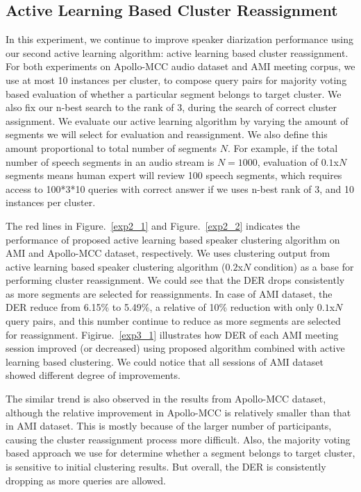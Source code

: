 \documentclass[journal,10pt]{IEEEtran}
\begin{document}
\subsection{Active Learning Based Cluster Reassignment}
In this experiment, we continue to improve speaker diarization performance using our second active learning algorithm: active learning based cluster reassignment. For both experiments on Apollo-MCC audio dataset and AMI meeting corpus, we use at most 10 instances per cluster, to compose query pairs for majority voting based evaluation of whether a particular segment belongs to target cluster. We also fix our n-best search to the rank of 3, during the search of correct cluster assignment. We evaluate our active learning algorithm by varying the amount of segments we will select for evaluation and reassignment. We also define this amount proportional to total number of segments $N$. For example, if the total number of speech segments in an audio stream is $N=1000$,  evaluation of $0.1$x$N$ segments means human expert will review 100 speech segments, which requires access to 100*3*10 queries with correct answer if we uses n-best rank of 3, and 10 instances per cluster.

The red lines in Figure.~\ref{exp2_1} and Figure.~\ref{exp2_2} indicates the performance of proposed active learning based speaker clustering algorithm on AMI and Apollo-MCC dataset, respectively. We uses clustering output from active learning based speaker clustering algorithm ($0.2$x$N$ condition) as a base for performing cluster reassignment. We could see that the DER drops consistently as more segments are selected for reassignments. In case of AMI dataset, the DER reduce from 6.15\% to 5.49\%, a relative of 10\% reduction with only $0.1$x$N$ query pairs, and this number continue to reduce as more segments are selected for reassignment. Figirue.~\ref{exp3_1} illustrates how DER of each AMI meeting session improved (or decreased) using proposed algorithm combined with active learning based clustering. We could notice that all sessions of AMI dataset showed different degree of improvements. 

The similar trend is also observed in the results from Apollo-MCC dataset, although the relative improvement in Apollo-MCC is relatively smaller than that in AMI dataset. This is mostly because of the larger number of participants, causing the cluster reassignment process more difficult. Also, the majority voting based approach we use for determine whether a segment belongs to target cluster, is sensitive to initial clustering results. But overall, the DER is consistently dropping as more queries are allowed.  
\end{document}
